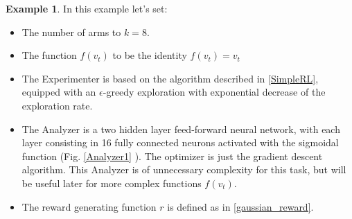 \documentclass[11pt,a4paper,twoside]{report}
\newcommand{\+}{\textnormal{+} }
\theoremstyle{definition}
\newtheorem{myex}[mythm]{Example}
\numberwithin{equation}{chapter}
\begin{document}
\begin{myex}
    In this example let's set:

    \begin{itemize}
      \item The number of arms to $k=8$.
      \item The function $f(v_t)$ to be the identity $f(v_t)=v_t$
      \item The Experimenter is based on the algorithm described in
      \ref{SimpleRL}, equipped with an $\epsilon$-greedy exploration with
      exponential decrease of the exploration rate. 
      \item The Analyzer is a two hidden layer feed-forward neural network, with
      each layer consisting in 16 fully connected neurons activated with the
      sigmoidal function (Fig. \ref{Analyzer1} ). The optimizer is just the
      gradient descent algorithm. This Analyzer is of unnecessary complexity for
      this task, but will be useful later for more complex functions $f(v_t)$.
      \item The reward generating function $r$ is defined as in
      \eqref{gaussian_reward}.
    \end{itemize}


\end{myex}
\end{document}
